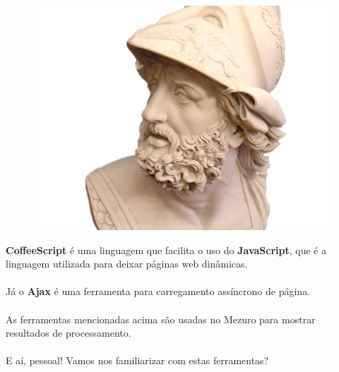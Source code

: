 \documentclass{beamer}
\begin{document}
\begin{frame}
\begin{multicols}{3}
    \columnbreak

    \begin{figure}[htb]
      \begin{center}
        \includegraphics[scale=0.08]{ajax.png}
      \end{center}
    \end{figure}

  \end{multicols}
  
  \textbf{CoffeeScript} é uma linguagem que facilita o uso do \textbf{JavaScript}, que é a linguagem utilizada para deixar páginas web dinâmicas. \\~\\
  Já o \textbf{Ajax} é uma ferramenta para carregamento assíncrono de página. \\~\\
  As ferramentas mencionadas acima são usadas no Mezuro para mostrar resultados de processamento. \\~\\
  
  E aí, pessoal! Vamos nos familiarizar com estas ferramentas?
\end{frame}
\end{document}
